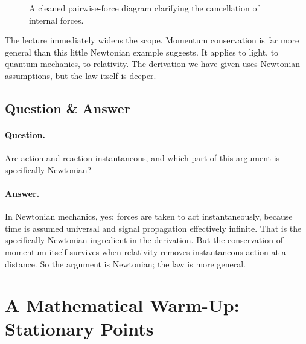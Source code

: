 \begin{figure}[h]
\centering
{}
\caption{A cleaned pairwise-force diagram clarifying the cancellation of internal forces.}
\end{figure}

The lecture immediately widens the scope. Momentum conservation is far more general than this little Newtonian example suggests. It applies to light, to quantum mechanics, to relativity. The derivation we have given uses Newtonian assumptions, but the law itself is deeper.

\subsection{Question \& Answer}

\paragraph{Question.} Are action and reaction instantaneous, and which part of this argument is specifically Newtonian?

\paragraph{Answer.} In Newtonian mechanics, yes: forces are taken to act instantaneously, because time is assumed universal and signal propagation effectively infinite. That is the specifically Newtonian ingredient in the derivation. But the conservation of momentum itself survives when relativity removes instantaneous action at a distance. So the argument is Newtonian; the law is more general.

\section{A Mathematical Warm-Up: Stationary Points}

